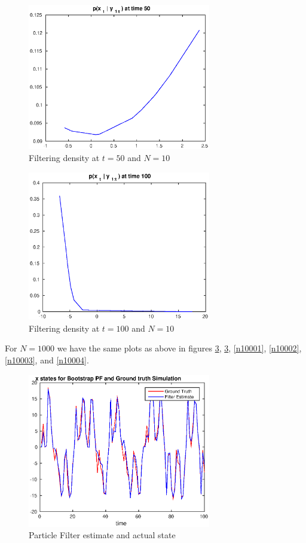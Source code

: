 \documentclass[11pt, english]{article}
\begin{document}
\begin{figure}[h]
  
  \centering
    \includegraphics[width=80mm]{./figs/011_15_t50N10.eps}
    \caption{Filtering density at $t=50$ and $N=10$}
    \label{n103}
\end{figure}

\begin{figure}[h]
  
  \centering
    \includegraphics[width=80mm]{./figs/012_15_t100N10.eps}
    \caption{Filtering density at $t=100$ and $N=10$}
    \label{n104}
\end{figure}


For $N=1000$ we have the same plots as above in figures \ref{n1000gtbt}, \ref{n1000gtbt}, \ref{n10001}, \ref{n10002}, \ref{n10003}, and \ref{n10004}.

\begin{figure}[h]
  
  \centering
    \includegraphics[width=80mm]{./figs/013_15_gt-and-bt.eps}
    \caption{Particle Filter estimate and actual state}
    \label{n1000gtbt}
\end{figure}
\end{document}
